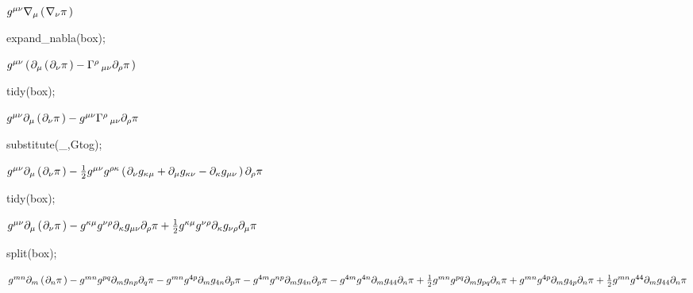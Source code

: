 \documentclass[10pt]{article}
\newcommand\brwrap[3]{%
  \setbox0=\hbox{$#2$}
  \left#1\vbox to \the\ht0{\hbox to 0pt{}}\right.\kern-.2em
  \begingroup #2\endgroup\kern-.15em
  \left.\vbox to \the\ht0{\hbox to 0pt{}}\right#3
}
\begin{document}
\begin{adjustwidth}{1em}{0cm}${}g^{\mu \nu} \nabla_{\mu}\brwrap{(}{\nabla_{\nu}{\pi}}{)}$\end{adjustwidth}
\begin{python}
expand_nabla(box);
\end{python}
\begin{adjustwidth}{1em}{0cm}${}g^{\mu \nu} \brwrap{(}{\partial_{\mu}\brwrap{(}{\partial_{\nu}{\pi}}{)}-\Gamma^{\rho}\,_{\mu \nu} \partial_{\rho}{\pi}}{)}$\end{adjustwidth}
\begin{python}
tidy(box);
\end{python}
\begin{adjustwidth}{1em}{0cm}${}g^{\mu \nu} \partial_{\mu}\brwrap{(}{\partial_{\nu}{\pi}}{)}-g^{\mu \nu} \Gamma^{\rho}\,_{\mu \nu} \partial_{\rho}{\pi}$\end{adjustwidth}
\begin{python}
substitute(_,Gtog);
\end{python}
\begin{adjustwidth}{1em}{0cm}${}g^{\mu \nu} \partial_{\mu}\brwrap{(}{\partial_{\nu}{\pi}}{)} - \frac{1}{2}g^{\mu \nu} g^{\rho \kappa} \brwrap{(}{\partial_{\nu}{g_{\kappa \mu}}+\partial_{\mu}{g_{\kappa \nu}}-\partial_{\kappa}{g_{\mu \nu}}}{)} \partial_{\rho}{\pi}$\end{adjustwidth}
\begin{python}
tidy(box);
\end{python}
\begin{adjustwidth}{1em}{0cm}${}g^{\mu \nu} \partial_{\mu}\brwrap{(}{\partial_{\nu}{\pi}}{)}-g^{\kappa \mu} g^{\nu \rho} \partial_{\kappa}{g_{\mu \nu}} \partial_{\rho}{\pi}+\frac{1}{2}g^{\kappa \mu} g^{\nu \rho} \partial_{\kappa}{g_{\nu \rho}} \partial_{\mu}{\pi}$\end{adjustwidth}
\begin{python}
split(box);
\end{python}
\begin{adjustwidth}{1em}{0cm}${}g^{m n} \partial_{m}\brwrap{(}{\partial_{n}{\pi}}{)}-g^{m n} g^{p q} \partial_{m}{g_{n p}} \partial_{q}{\pi}-g^{m n} g^{4 p} \partial_{m}{g_{4 n}} \partial_{p}{\pi}-g^{4 m} g^{n p} \partial_{m}{g_{4 n}} \partial_{p}{\pi}-g^{4 m} g^{4 n} \partial_{m}{g_{4 4}} \partial_{n}{\pi}+\frac{1}{2}g^{m n} g^{p q} \partial_{m}{g_{p q}} \partial_{n}{\pi}+g^{m n} g^{4 p} \partial_{m}{g_{4 p}} \partial_{n}{\pi}+\frac{1}{2}g^{m n} g^{4 4} \partial_{m}{g_{4 4}} \partial_{n}{\pi}$\end{adjustwidth}
\end{document}
